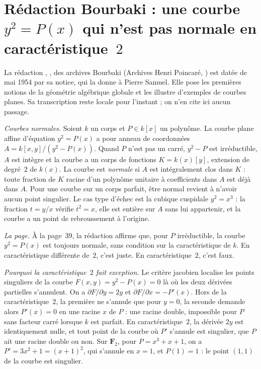 \section[Rédaction Bourbaki \redac{197} : la courbe $y^2 = P(x)$ en caractéristique~$2$]{Rédaction Bourbaki  : une courbe $y^2 = P(x)$ qui n'est pas normale en caractéristique~$2$\protect{}}\label{sec:bourbaki-197}

La rédaction , , des archives Bourbaki (Archives Henri Poincaré, ) est datée de mai 1954 par sa notice, qui la donne à Pierre Samuel. Elle pose les premières notions de la géométrie algébrique globale et les illustre d'exemples de courbes planes. Sa transcription reste locale pour l'instant ; on n'en cite ici aucun passage.

\emph{Courbes normales.} Soient $k$ un corps et $P \in k[x]$ un polynôme. La courbe plane affine d'équation $y^2 = P(x)$ a pour anneau de coordonnées $A = k[x, y]/(y^2 - P(x))$. Quand $P$ n'est pas un carré, $y^2 - P$ est irréductible, $A$ est intègre et la courbe a un corps de fonctions $K = k(x)[y]$, extension de degré~$2$ de $k(x)$. La courbe est \emph{normale} si $A$ est intégralement clos dans $K$ : toute fraction de $K$ racine d'un polynôme unitaire à coefficients dans $A$ est déjà dans $A$. Pour une courbe sur un corps parfait, être normal revient à n'avoir aucun point singulier. Le cas type d'échec est la cubique cuspidale $y^2 = x^3$ : la fraction $t = y/x$ vérifie $t^2 = x$, elle est entière sur $A$ sans lui appartenir, et la courbe a un point de rebroussement à l'origine.

\emph{La page.} À la page~39, la rédaction affirme que, pour $P$ irréductible, la courbe $y^2 = P(x)$ est toujours normale, sans condition sur la caractéristique de $k$. En caractéristique différente de~$2$, c'est juste. En caractéristique~$2$, c'est faux.

\emph{Pourquoi la caractéristique~$2$ fait exception.} Le critère jacobien localise les points singuliers de la courbe $F(x, y) = y^2 - P(x) = 0$ là où les deux dérivées partielles s'annulent. On a $\partial F / \partial y = 2y$ et $\partial F / \partial x = -P'(x)$. Hors de la caractéristique~$2$, la première ne s'annule que pour $y = 0$, la seconde demande alors $P'(x) = 0$ en une racine $x$ de $P$ : une racine double, impossible pour $P$ sans facteur carré lorsque $k$ est parfait. En caractéristique~$2$, la dérivée $2y$ est identiquement nulle, et tout point de la courbe où $P'$ s'annule est singulier, que $P$ ait une racine double ou non. Sur $\mathbf F_2$, pour $P = x^3 + x + 1$, on a $P' = 3x^2 + 1 = (x + 1)^2$, qui s'annule en $x = 1$, et $P(1) = 1$ : le point $(1, 1)$ de la courbe est singulier.


